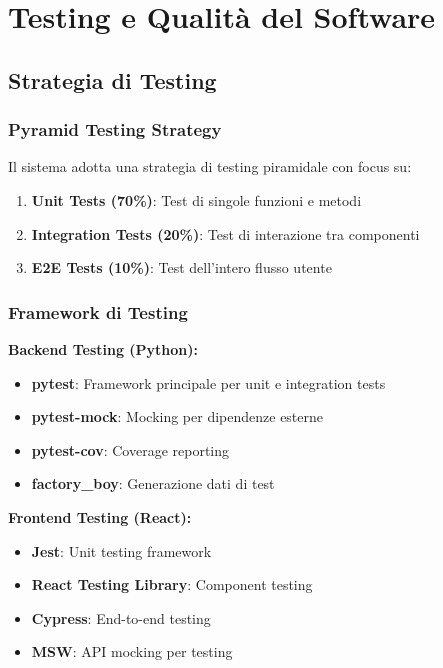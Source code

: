\documentclass[12pt,a4paper]{report}
\begin{document}
\chapter{Testing e Qualità del Software}

\section{Strategia di Testing}

\subsection{Pyramid Testing Strategy}

Il sistema adotta una strategia di testing piramidale con focus su:

\begin{enumerate}
    \item \textbf{Unit Tests (70\%)}: Test di singole funzioni e metodi
    \item \textbf{Integration Tests (20\%)}: Test di interazione tra componenti
    \item \textbf{E2E Tests (10\%)}: Test dell'intero flusso utente
\end{enumerate}

\subsection{Framework di Testing}

\textbf{Backend Testing (Python):}
\begin{itemize}
    \item \textbf{pytest}: Framework principale per unit e integration tests
    \item \textbf{pytest-mock}: Mocking per dipendenze esterne
    \item \textbf{pytest-cov}: Coverage reporting
    \item \textbf{factory\_boy}: Generazione dati di test
\end{itemize}

\textbf{Frontend Testing (React):}
\begin{itemize}
    \item \textbf{Jest}: Unit testing framework
    \item \textbf{React Testing Library}: Component testing
    \item \textbf{Cypress}: End-to-end testing
    \item \textbf{MSW}: API mocking per testing
\end{itemize}
\end{document}
